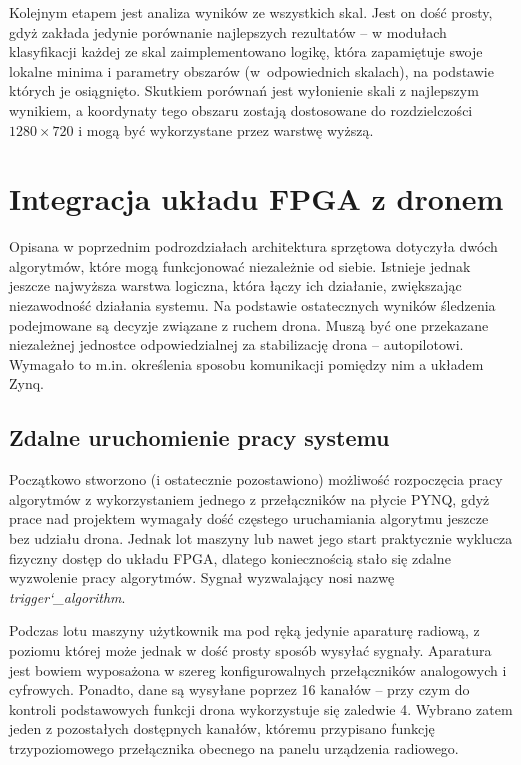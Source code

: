 Kolejnym etapem jest analiza wyników ze wszystkich skal.
Jest on dość prosty, gdyż zakłada jedynie porównanie najlepszych rezultatów -- w modułach klasyfikacji każdej ze skal zaimplementowano logikę, która zapamiętuje swoje lokalne minima i parametry obszarów (w~odpowiednich skalach), na podstawie których je osiągnięto. 
Skutkiem porównań jest wyłonienie skali z najlepszym wynikiem, a koordynaty tego obszaru zostają dostosowane do rozdzielczości $1280 \times 720$ i mogą być wykorzystane przez warstwę wyższą. 

\section{Integracja układu FPGA z dronem}

Opisana w poprzednim podrozdziałach architektura sprzętowa dotyczyła dwóch algorytmów, które mogą funkcjonować niezależnie od siebie. 
Istnieje jednak jeszcze najwyższa warstwa logiczna, która łączy ich działanie, zwiększając niezawodność działania systemu. 
Na podstawie ostatecznych wyników śledzenia podejmowane są decyzje związane z ruchem drona. 
Muszą być one przekazane niezależnej jednostce odpowiedzialnej za stabilizację drona -- autopilotowi. 
Wymagało to m.in. określenia sposobu komunikacji pomiędzy nim a układem Zynq.



\subsection{Zdalne uruchomienie pracy systemu}

Początkowo stworzono (i ostatecznie pozostawiono) możliwość rozpoczęcia pracy algorytmów z wykorzystaniem jednego z przełączników na płycie PYNQ, gdyż prace nad projektem wymagały dość częstego uruchamiania algorytmu jeszcze bez udziału drona. 
Jednak lot maszyny lub nawet jego start praktycznie wyklucza fizyczny dostęp do układu FPGA, dlatego koniecznością stało się zdalne wyzwolenie pracy algorytmów. 
Sygnał wyzwalający nosi nazwę \textit{trigger\char`_algorithm}.

Podczas lotu maszyny użytkownik ma pod ręką jedynie aparaturę radiową, z poziomu której może jednak w dość prosty sposób wysyłać sygnały. 
Aparatura jest bowiem wyposażona w szereg konfigurowalnych przełączników analogowych i cyfrowych. 
Ponadto, dane są wysyłane poprzez 16 kanałów -- przy czym do kontroli podstawowych funkcji drona wykorzystuje się zaledwie 4. 
Wybrano zatem jeden z pozostałych dostępnych kanałów, któremu przypisano funkcję trzypoziomowego przełącznika obecnego na panelu urządzenia radiowego.

